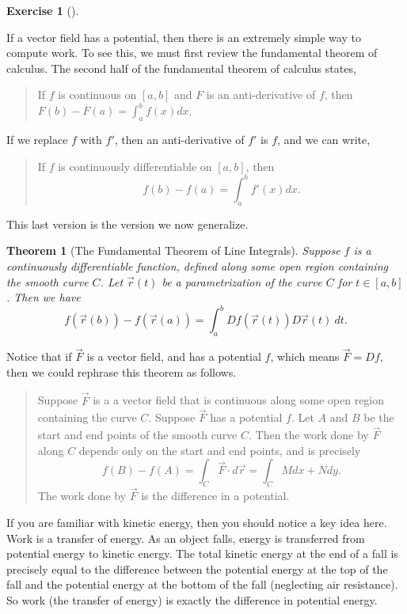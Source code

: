 \documentclass[10pt,]{book}
\theoremstyle{plain}
\newtheorem{theorem}{Theorem}[section]
\theoremstyle{definition}
\theoremstyle{definition}
\theoremstyle{definition}
\theoremstyle{definition}
\newtheorem{exploration}[project]{Exercise}
\theoremstyle{definition}
\numberwithin{equation}{section}
\begin{document}
\begin{exploration}[]\label{exploration-205}
\end{exploration}
If a vector field has a potential, then there is an extremely simple way to compute work. To see this, we must first review the fundamental theorem of calculus. The second half of the fundamental theorem of calculus states,%
\begin{quote}\hypertarget{blockquote-6}{}
If \(f\) is continuous on \([a,b]\) and \(F\) is an anti-derivative of \(f\), then \(F(b)-F(a) = \int_a^b f(x) dx\).\end{quote}
If we replace \(f\) with \(f'\), then an anti-derivative of \(f'\) is \(f\), and we can write,%
\begin{quote}\hypertarget{blockquote-7}{}
If \(f\) is continuously differentiable on \([a,b]\), then%
\begin{equation*}
f(b)-f(a)=\int_a^b f'(x) dx.
\end{equation*}
\end{quote}
This last version is the version we now generalize.%
\begin{theorem}[{The Fundamental Theorem of Line Integrals}]\label{theorem-6}
Suppose \(f\) is a continuously differentiable function, defined along some open region containing the smooth curve \(C\). Let \(\vec r(t)\) be a parametrization of the curve \(C\) for \(t\in[a,b]\). Then we have%
\begin{equation*}
f(\vec r(b))-f(\vec r(a))=\int_a^b Df(\vec r(t))D\vec r(t)\ dt.
\end{equation*}
%
\end{theorem}
Notice that if \(\vec F\) is a vector field, and has a potential \(f\), which means \(\vec F = Df\), then we could rephrase this theorem as follows.%
\begin{quote}\hypertarget{blockquote-8}{}
Suppose \(\vec F\) is a a vector field that is continuous along some open region containing the curve \(C\). Suppose \(\vec F\) has a potential \(f\). Let \(A\) and \(B\) be the start and end points of the smooth curve \(C\).  Then the work done by \(\vec F\) along \(C\) depends only on the start and end points, and is precisely%
\begin{equation*}
f(B)-f(A)=\int_C \vec F\cdot d\vec r = \int_C Mdx+Ndy.
\end{equation*}
The work done by \(\vec F\) is the difference in a potential.\end{quote}
If you are familiar with kinetic energy, then you should notice a key idea here. Work is a transfer of energy. As an object falls, energy is transferred from potential energy to kinetic energy. The total kinetic energy at the end of a fall is precisely equal to the difference between the potential energy at the top of the fall and the potential energy at the bottom of the fall (neglecting air resistance). So work (the transfer of energy) is exactly the difference in potential energy.%
\end{document}
